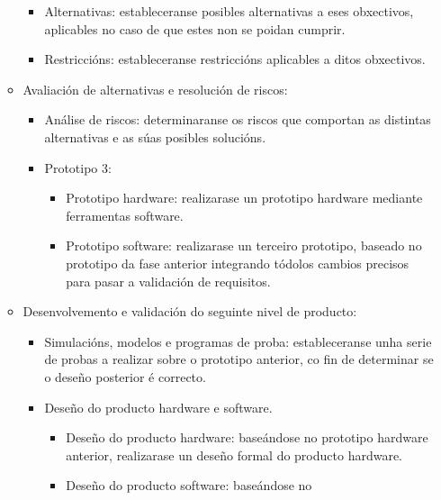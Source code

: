 \begin{enumerate}
\begin{itemize}
\begin{itemize}
               \item Alternativas: estableceranse posibles alternativas a eses
                     obxectivos, aplicables no caso de que estes non se poidan
                     cumprir.
               \item Restriccións: estableceranse restriccións aplicables a
                     ditos obxectivos.
              \end{itemize}
        \item Avaliación de alternativas e resolución de riscos:
              \begin{itemize}
               \item Análise de riscos: determinaranse os riscos que comportan
                     as distintas alternativas e as súas posibles solucións.
               \item Prototipo 3:
                     \begin{itemize}
                      \item Prototipo hardware: realizarase un prototipo
                            hardware mediante ferramentas software.
                      \item Prototipo software: realizarase un terceiro
                            prototipo, baseado no prototipo da fase anterior
                            integrando tódolos cambios precisos para pasar a
                            validación de requisitos.
                     \end{itemize}
              \end{itemize}
        \item Desenvolvemento e validación do seguinte nivel de producto:
              \begin{itemize}
               \item Simulacións, modelos e programas de proba: estableceranse
                     unha serie de probas a realizar sobre o prototipo
                     anterior, co fin de determinar se o deseño posterior é
                     correcto.
               \item Deseño do producto hardware e software.
                     \begin{itemize}
                      \item Deseño do producto hardware: baseándose no
                            prototipo hardware anterior, realizarase un deseño
                            formal do producto hardware.
                      \item Deseño do producto software: baseándose no

\end{itemize}
\end{itemize}
\end{itemize}
\end{enumerate}
